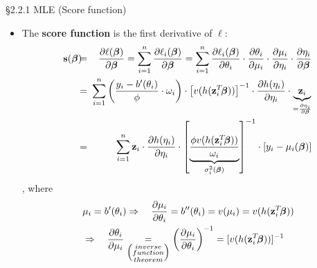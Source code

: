 \documentclass{beamer}
\begin{document}
\begin{frame}{\S2.2.1  MLE (Score function)}
\begin{itemize}
\item
The \textbf{score function} is the first derivative of $\ell$: {\footnotesize
\begin{eqnarray*}
\textbf{s}(\mbox{\boldmath $\beta$})&\!\!\!=\!\!\!& \frac{\partial \ell(\mbox{\boldmath $\beta$})}{\partial\mbox{\boldmath 
$\beta$}}=\sum_{i=1}^n\frac{\partial \ell_i(\mbox{\boldmath $\beta$})}{\partial\mbox{\boldmath $\beta$}}
=\sum_{i=1}^n  \frac{\partial \ell_i(\mbox{\boldmath $\beta$})}{\partial\theta_i}\cdot
\frac{\partial \theta_i}{\partial\mu_i}\cdot \frac{\partial \mu_i}{\partial\eta_i} \cdot
\frac{\partial \eta_i}{\partial\mbox{\boldmath $\beta$}}\\
&\!\!\!=\!\!\!&\sum_{i=1}^n \left(\frac{y_i-b^\prime(\theta_i)}{\phi}\cdot\omega_i\right)\cdot
\left[v(h(\textbf{z}_i^T\!\mbox{\boldmath $\beta$}))\right]^{-1}\cdot
 \frac{\partial h(\eta_i)}{\partial\eta_i}\cdot \underbrace{ \textbf{z}_i }_{ = \frac{\partial \eta_i}{ \partial {\boldsymbol \beta}}}\\
&\!\!\!=\!\!\!& \sum_{i=1}^n \textbf{z}_i\cdot \frac{\partial h(\eta_i)}{\partial\eta_i}\cdot
\left[ \underbrace{\frac{\phi v(h(\textbf{z}_i^T\!\mbox{\boldmath $\beta$}))}{\omega_i}}_{\sigma^2_i({\boldsymbol \beta})}\right]^{-1}\cdot
\left[y_i-\mu_i(\mbox{\boldmath $\beta$})\right]
\end{eqnarray*}},
where
\begin{align*}
& \mu_i=b^\prime(\theta_i) \Rightarrow \quad \frac{\partial \mu_i}{\partial\theta_i}=
b^{\prime\prime}(\theta_i)=v(\mu_i)=v(h(\textbf{z}_i^T\!\mbox{\boldmath $\beta$})) \\
&\Rightarrow \quad   \frac{\partial \theta_i}{\partial\mu_i} 
\underset{\Big(\substack{inverse \\ function\\ theorem}\Big)}{=}
\left(\frac{\partial \mu_i}{\partial\theta_i}\right)^{-1} = [v(h(\textbf{z}_i^T\!\mbox{\boldmath $\beta$})) ]^{-1} %
\end{align*}
\end{itemize}




\end{frame}
\end{document}
